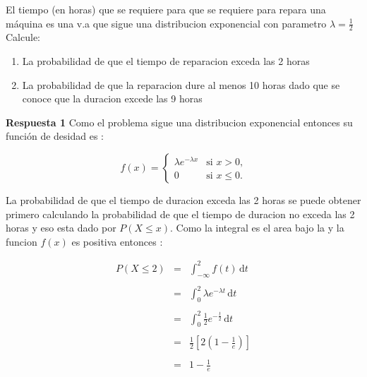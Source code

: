 \documentclass{article}
\begin{document}
    \begin{flushleft}

        El tiempo (en horas) que se requiere para que se requiere para repara una m\'aquina es una v.a 
        que sigue una distribucion exponencial con parametro $ \lambda = \frac{1}{2} $ Calcule: 
        \begin{enumerate}
            \item La probabilidad de que el tiempo de reparacion exceda las 2 horas 
            \item La probabilidad de que la reparacion dure al menos 10 horas dado que se conoce que
            la duracion excede las 9 horas 
        \end{enumerate} 
        
        {\bf Respuesta 1 } 
        Como el problema sigue una distribucion exponencial entonces su funci\'on de desidad es : 

        
        \begin{equation*}
            f(x)=\begin{cases}
                \lambda e^{-\lambda x }  & \mbox{si $x>0$,}
                \\
                0                        & \mbox{si $x\le 0$.}
                \end{cases}
        \end{equation*}

        La probabilidad de que el tiempo de duracion exceda las 2 horas se 
        puede obtener primero calculando la probabilidad de que el tiempo de 
        duracion no exceda las 2 horas  y eso esta dado por $P \left(X \le x\right)$. 
        Como la integral es el area bajo la y la funcion $f\left(x\right) $ es positiva 
        entonces : 
        


        \begin{equation*}
            \begin{array}{rcl}
                P \left(X \le 2 \right) & = & \int_{ - \infty   }^{2}  f\left(t\right)\,\mathrm{d}t
                \\\\
                                        & = & \int_{0 }^{2}  \lambda e^{- \lambda t}\,\mathrm{d}t
                \\\\
                                        & = & \int_{0 }^{2}  \frac{1}{2} e^{- \frac{t}{2} }\,\mathrm{d}t
                \\\\
                                        & = & \frac{1}{2} \left[2 \left(1-\frac{1}{e}\right)\right]
                \\\\
                                        & = & 1 - \frac{1}{e}
            \end{array}
        \end{equation*}
        


\end{flushleft}
\end{document}
